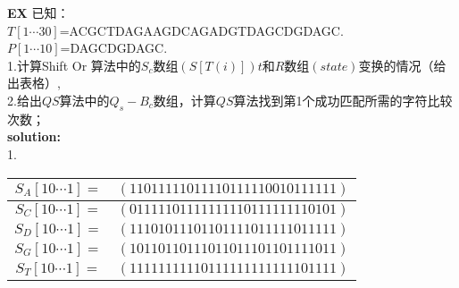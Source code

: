 \documentclass[UTF8]{ctexart}
\begin{document}
    \noindent\textbf{EX} \quad 已知：\\
        $T[1\cdots 30]$=ACGCTDAGAAGDCAGADGTDAGCDGDAGC.\\
        $P[1\cdots10]$=DAGCDGDAGC.\\
    	\noindent1.计算Shift Or 算法中的$S_c$数组$(S[T(i)])t$和$R$数组$(state)$变换的情况（给出表格）,\\
    	2.给出$QS$算法中的$Q_s-B_c$数组，计算$QS$算法找到第1个成功匹配所需的字符比较次数；\\

    \noindent\textbf{solution:} \\  
    1.
    \begin{center}
    	\begin{tabular}{|cc|}
    			\hline 
    			$S_A[10\cdots1]=$&$(11011111011110111110010111111)$\\
    			\hline
    			$S_C[10\cdots1]=$&$(01111101111111110111111110101)$\\
    			\hline
    			$S_D[10\cdots1]=$&$(11101011101101111011111011111)$\\
    			\hline
    			$S_G[10\cdots1]=$&$(10110110111011011101101111011)$\\
    			\hline
    			$S_T[10\cdots1]=$&$(11111111110111111111111101111)$\\
    			\hline
    	\end{tabular}
    \end{center}
\end{document}
